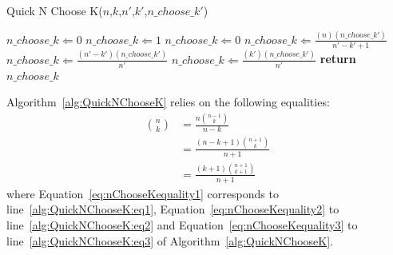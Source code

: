 \begin{algorithm}[H]
  \caption{Quick N Choose K($n$,$k$,$n'$,$k'$,$\mathit{n\_choose\_k'}$)}  \label{alg:QuickNChooseK}
  \begin{algorithmic}[1]
  \State $\mathit{n\_choose\_k} \Longleftarrow 0$
  \State $\mathit{n\_choose\_k} \Longleftarrow 1$
  \Else
  \State $\mathit{n\_choose\_k} \Longleftarrow 0$
  \EndIf
  \State $\mathit{n\_choose\_k} \Longleftarrow \frac{(n)(\mathit{n\_choose\_k'})}{n' - k' + 1}$ \label{alg:QuickNChooseK:eq1}
  \State $\mathit{n\_choose\_k} \Longleftarrow \frac{(n' - k')(\mathit{n\_choose\_k'})}{n'}$ \label{alg:QuickNChooseK:eq2}
  \State $\mathit{n\_choose\_k} \Longleftarrow \frac{(k')(\mathit{n\_choose\_k'})}{n'}$ \label{alg:QuickNChooseK:eq3}
  \EndIf
  \State \textbf{return} $\mathit{n\_choose\_k}$
  \end{algorithmic}
\end{algorithm}

Algorithm~\ref{alg:QuickNChooseK} relies on the following equalities:
\begin{align}
{n \choose k} &= \frac{n{n - 1 \choose k}}{{n - k}} \label{eq:nChooseKequality1} \\
&= \frac{(n - k + 1){n + 1 \choose k}}{{n + 1}} \label{eq:nChooseKequality2} \\
&= \frac{(k + 1){n + 1 \choose k + 1}}{{n + 1}} \label{eq:nChooseKequality3} 
\end{align}
where Equation~\eqref{eq:nChooseKequality1} corresponds to line~\ref{alg:QuickNChooseK:eq1}, Equation~\eqref{eq:nChooseKequality2} to line~\ref{alg:QuickNChooseK:eq2} and Equation~\eqref{eq:nChooseKequality3} to line~\ref{alg:QuickNChooseK:eq3} of Algorithm~\ref{alg:QuickNChooseK}.

